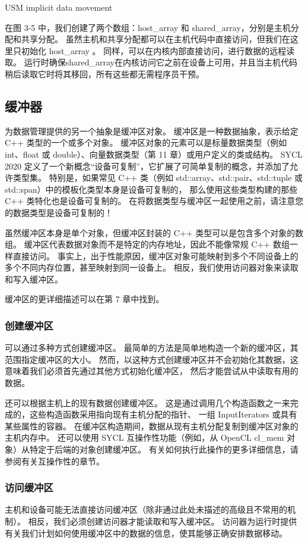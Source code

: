 {\color{red} USM implicit data movement }

在图 3-5 中，我们创建了两个数组：host\_array 和 shared\_array，分别是主机分配和共享分配。 
虽然主机和共享分配都可以在主机代码中直接访问，但我们在这里只初始化 host\_array 。 
同样，可以在内核内部直接访问，进行数据的远程读取。 
运行时确保shared\_array在内核访问它之前在设备上可用，并且当主机代码稍后读取它时将其移回，所有这些都无需程序员干预。

\subsection{缓冲器}
为数据管理提供的另一个抽象是缓冲区对象。 缓冲区是一种数据抽象，表示给定 C++ 类型的一个或多个对象。 
缓冲区对象的元素可以是标量数据类型（例如 int、float 或 double）、向量数据类型（第 11 章）或用户定义的类或结构。 
SYCL 2020 定义了一个新概念“设备可复制”，它扩展了可简单复制的概念，并添加了允许类型集。 
特别是，如果常见 C++ 类（例如 std::array、std::pair、std::tuple 或 std::span）中的模板化类型本身是设备可复制的，
那么使用这些类型构建的那些 C++ 类特化也是设备可复制的。 
在将数据类型与缓冲区一起使用之前，请注意您的数据类型是设备可复制的！

虽然缓冲区本身是单个对象，但缓冲区封装的 C++ 类型可以是包含多个对象的数组。 
缓冲区代表数据对象而不是特定的内存地址，因此不能像常规 C++ 数组一样直接访问。 
事实上，出于性能原因，缓冲区对象可能映射到多个不同设备上的多个不同内存位置，甚至映射到同一设备上。 
相反，我们使用访问器对象来读取和写入缓冲区。

缓冲区的更详细描述可以在第 7 章中找到。

\subsubsection{创建缓冲区}
可以通过多种方式创建缓冲区。 最简单的方法是简单地构造一个新的缓冲区，其范围指定缓冲区的大小。 
然而，以这种方式创建缓冲区并不会初始化其数据，这意味着我们必须首先通过其他方式初始化缓冲区，
然后才能尝试从中读取有用的数据。

还可以根据主机上的现有数据创建缓冲区。 
这是通过调用几个构造函数之一来完成的，这些构造函数采用指向现有主机分配的指针、
一组 InputIterators 或具有某些属性的容器。 在缓冲区构造期间，数据从现有主机分配复制到缓冲区对象的主机内存中。 
还可以使用 SYCL 互操作性功能（例如，从 OpenCL cl\_mem 对象）从特定于后端的对象创建缓冲区。 
有关如何执行此操作的更多详细信息，请参阅有关互操作性的章节。

\subsubsection{访问缓冲区}
主机和设备可能无法直接访问缓冲区（除非通过此处未描述的高级且不常用的机制）。 
相反，我们必须创建访问器才能读取和写入缓冲区。 
访问器为运行时提供有关我们计划如何使用缓冲区中的数据的信息，使其能够正确安排数据移动。

